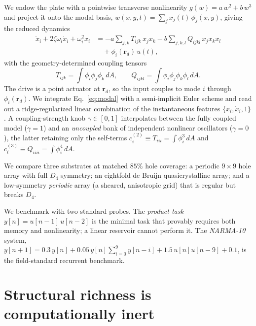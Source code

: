 \documentclass[aps,prapplied,reprint,amsmath,amssymb,floatfix]{revtex4-2}
\begin{document}
We endow the plate with a pointwise transverse nonlinearity
$g(w)=a\,w^2+b\,w^3$ and project it onto the modal basis,
$w(x,y,t)=\sum_j x_j(t)\,\phi_j(x,y)$, giving the reduced dynamics
\begin{align}
\ddot x_i + 2\zeta\omega_i \dot x_i + \omega_i^2 x_i
&= -a\!\sum_{j,k} T_{ijk}\,x_j x_k
   -b\!\sum_{j,k,l} Q_{ijkl}\,x_j x_k x_l \nonumber\\
&\quad + \phi_i(\bm r_d)\,u(t),
\label{eq:modal}
\end{align}
with the geometry-determined coupling tensors
\begin{equation}
T_{ijk}=\!\int\!\phi_i\phi_j\phi_k\,dA,\qquad
Q_{ijkl}=\!\int\!\phi_i\phi_j\phi_k\phi_l\,dA .
\label{eq:tensors}
\end{equation}
The drive is a point actuator at $\bm r_d$, so the input couples to mode $i$
through $\phi_i(\bm r_d)$. We integrate Eq.~\eqref{eq:modal} with a
semi-implicit Euler scheme and read out a ridge-regularized linear combination
of the instantaneous features $\{x_i,\dot x_i,1\}$. A coupling-strength knob
$\gamma\in[0,1]$ interpolates between the fully coupled model ($\gamma=1$) and
an \emph{uncoupled} bank of independent nonlinear oscillators ($\gamma=0$), the
latter retaining only the self-terms $c^{(2)}_i\equiv T_{iii}=\int\phi_i^3\,dA$
and $c^{(3)}_i\equiv Q_{iiii}=\int\phi_i^4\,dA$.

We compare three substrates at matched $85\%$ hole coverage: a periodic
$9\times 9$ hole array with full $D_4$ symmetry; an eightfold de Bruijn
quasicrystalline array; and a low-symmetry \emph{periodic} array (a sheared,
anisotropic grid) that is regular but breaks $D_4$.

We benchmark with two standard probes. The \emph{product task}
$y[n]=u[n-1]\,u[n-2]$ is the minimal task that provably requires both memory
and nonlinearity; a linear reservoir cannot perform it. The
\emph{NARMA-10} system,
$y[n{+}1]=0.3\,y[n]+0.05\,y[n]\!\sum_{i=0}^{9}y[n{-}i]+1.5\,u[n]u[n{-}9]+0.1$,
is the field-standard recurrent benchmark.

\section{Structural richness is computationally inert}
\end{document}
